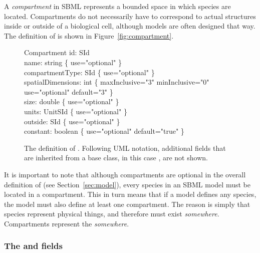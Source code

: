 A \emph{compartment} in SBML represents a bounded space in which
species are located.  Compartments do not necessarily have to
correspond to actual structures inside or outside of a biological
cell, although models are often designed that way.  The definition
of \Compartment is shown in Figure~\vref{fig:compartment}.

\begin{figure}[htb]
  \vspace*{1ex}
  \centering
  \begin{classbox}{Compartment}
    id: SId                                                                                       \\
    name: string \{ use="optional" \}                                                             \\
    compartmentType: SId \{ use="optional" \}                                           \\
    spatialDimensions: int \{ maxInclusive="3" minInclusive="0" use="optional" default="3" \} \\
    size: double \{ use="optional" \}                                                             \\
    units: UnitSId \{ use="optional" \}                                                               \\
    outside: SId \{ use="optional" \}                                                             \\
    constant: boolean \{ use="optional" default="true" \}                                         \\
  \end{classbox}
  \caption{The definition of \Compartment.  Following UML notation,
    additional fields
    that are inherited from a base class, in this case \SBase, are not shown.}
  \label{fig:compartment}
\end{figure}

It is important to note that although compartments are optional in
the overall definition of \Model (see Section~\ref{sec:model}),
every species in an SBML model must be located in a compartment.
This in turn means that if a model defines any species, the model
must also define at least one compartment.  The reason is simply
that species represent physical things, and therefore must exist
\emph{somewhere}.  Compartments represent the \emph{somewhere}.


\subsubsection{The  and  fields}

